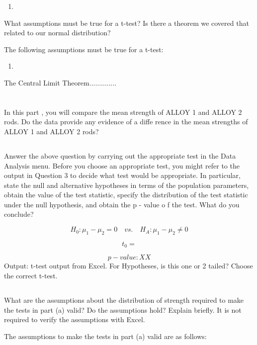 \documentclass[letterpaper]{article}
\begin{document}
\begin{enumerate}
 \item
\end{enumerate}

What assumptions must be true for a t-test? Is there a theorem we covered that
related to our normal distribution?

The following assumptions must be true for a t-test:
\begin{enumerate}
 \item
\end{enumerate}
The Central Limit Theorem..............

\section{}%
In this part , you will compare the mean strength of ALLOY 1 and ALLOY 2 rods.
Do the data provide  any evidence of a diffe rence in the mean strengths of
ALLOY 1 and ALLOY 2 rods?

\subsection{}%
Answer the above question by carrying out the appropriate test in the Data
Analysis menu. Before  you choose an appropriate test, you might refer to the
output in Question  3 to decide  what test would be appropriate.  In particular,
state the null and alternative hypotheses in terms of the  population
parameters, obtain the value of the test statistic, specify the distribution of
the test statistic  under the null hypothesis, and obtain the  p - value o f the
test. What do you conclude?

$$H_0: \mu_1 - \mu_2 =0  \quad vs. \quad H_A: \mu_1 - \mu_2 \neq 0  $$

$$t_0 =$$

$$ {p-value}: XX $$
Output: t-test output from Excel. For Hypotheses, is this one or 2 tailed?
Choose the correct t-test.

\subsection{}%
What are the assumptions about the distribution of strength required to make the
tests in part (a) valid?  Do the assumptions hold?  Explain briefly. It is not
required to verify the assumptions with Excel.

The assumptions to make the tests in part (a) valid are as follows:
\end{document}
